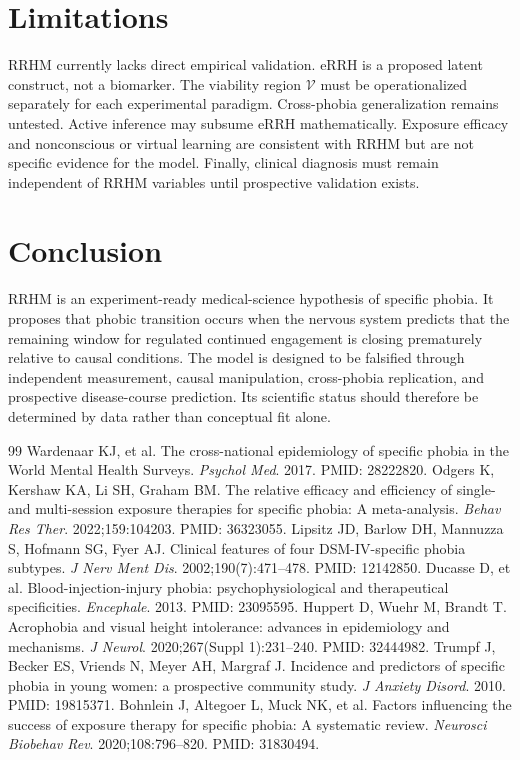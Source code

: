 \documentclass[11pt]{article}
\begin{document}
\section{Limitations}
RRHM currently lacks direct empirical validation. eRRH is a proposed latent construct, not a biomarker. The viability region $\mathcal V$ must be operationalized separately for each experimental paradigm. Cross-phobia generalization remains untested. Active inference may subsume eRRH mathematically. Exposure efficacy and nonconscious or virtual learning are consistent with RRHM but are not specific evidence for the model. Finally, clinical diagnosis must remain independent of RRHM variables until prospective validation exists.

\section{Conclusion}
RRHM is an experiment-ready medical-science hypothesis of specific phobia. It proposes that phobic transition occurs when the nervous system predicts that the remaining window for regulated continued engagement is closing prematurely relative to causal conditions. The model is designed to be falsified through independent measurement, causal manipulation, cross-phobia replication, and prospective disease-course prediction. Its scientific status should therefore be determined by data rather than conceptual fit alone.

\begin{thebibliography}{99}
 Wardenaar KJ, et al. The cross-national epidemiology of specific phobia in the World Mental Health Surveys. \emph{Psychol Med}. 2017. PMID: 28222820.
 Odgers K, Kershaw KA, Li SH, Graham BM. The relative efficacy and efficiency of single- and multi-session exposure therapies for specific phobia: A meta-analysis. \emph{Behav Res Ther}. 2022;159:104203. PMID: 36323055.
 Lipsitz JD, Barlow DH, Mannuzza S, Hofmann SG, Fyer AJ. Clinical features of four DSM-IV-specific phobia subtypes. \emph{J Nerv Ment Dis}. 2002;190(7):471--478. PMID: 12142850.
 Ducasse D, et al. Blood-injection-injury phobia: psychophysiological and therapeutical specificities. \emph{Encephale}. 2013. PMID: 23095595.
 Huppert D, Wuehr M, Brandt T. Acrophobia and visual height intolerance: advances in epidemiology and mechanisms. \emph{J Neurol}. 2020;267(Suppl 1):231--240. PMID: 32444982.
 Trumpf J, Becker ES, Vriends N, Meyer AH, Margraf J. Incidence and predictors of specific phobia in young women: a prospective community study. \emph{J Anxiety Disord}. 2010. PMID: 19815371.
 Bohnlein J, Altegoer L, Muck NK, et al. Factors influencing the success of exposure therapy for specific phobia: A systematic review. \emph{Neurosci Biobehav Rev}. 2020;108:796--820. PMID: 31830494.
\end{thebibliography}
\end{document}
